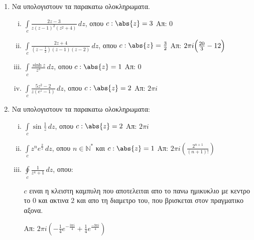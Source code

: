 



\everymath{\displaystyle}



\begin{center}
\end{center}

\vspace{\baselineskip} 

\begin{enumerate}

\item Να υπολογιστουν τα παρακατω ολοκληρωματα.

\begin{enumerate}[i)]

\item $\int\limits_c\frac{2z-3}{z(z-1)^2(z^2+4)}\,dz$, οπου $c:\abs{z}=3$ \hfill Απ: 0
\item $\int\limits_c\frac{2z+4}{(z-\frac{1}{2})(z-1)(z-2)}\,dz$, οπου $c:\abs{z}=\frac{3}{2}$ \hfill Απ: $2\pi i\Bigl(\frac{20}{3}-12\Bigr)$
\item $\int\limits_c\frac{\sinh z}{z^3}\,dz$, οπου $c:\abs{z}=1$ \hfill Απ: $0$
\item $\int\limits_c\frac{5z^2-2}{z(e^z-1)}\,dz$, οπου $c:\abs{z}=2$ \hfill Απ: $2\pi i$
\end{enumerate}

\item Να υπολογιστουν τα παρακατω ολοκληρωματα:

\begin{enumerate}[i)]

\item $\int\limits_c\sin \frac{1}{z}\,dz$, οπου $c:\abs{z}=2$ \hfill Απ: $2\pi i$

\item $\int\limits_c z^ne^{\frac{2}{z}}\,dz$, οπου $n\in\mathbb{N}^*$ και $c:\abs{z}=1$ \hfill Απ: $2\pi i (\frac{2^{n+1}}{(n+1)!})$

\item $\oint\limits_c\frac{1}{z^4+1}\,dz$, οπου:

$c$ ειναι η κλειστη καμπυλη που αποτελειται απο το πανω ημικυκλιο με κεντρο το $0$ και ακτινα $2$ και απο τη διαμετρο του, που βρισκεται στον πραγματικο αξονα. 

\hfill Απ: $2\pi i(-\frac{1}{4}e^{-\frac{3\pi i}{4}}+\frac{1}{4}e^{\frac{-9\pi i }{4}})$


\end{enumerate}
\end{enumerate}
